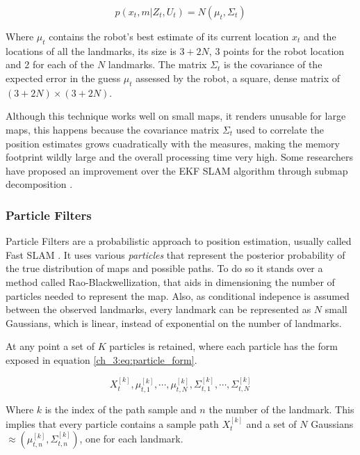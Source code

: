       \begin{equation} \label{ch_3:eq:ekf_representation}
        p(x_{t}, m | Z_{t}, U_{t}) = N(\mu_{t}, \Sigma_{t})
      \end{equation}

      Where $\mu_{t}$ contains the robot's best estimate of its current location $x_{t}$ and the locations of all the landmarks, its size is $3 + 2N$, 3 points for the robot location and 2 for each of the $N$ landmarks. The matrix $\Sigma_{t}$ is the covariance of the expected error in the guess $\mu_{t}$ assessed by the robot, a square, dense matrix of $(3 + 2N) \times (3 + 2N)$.

      Although this technique works well on small maps, it renders unusable for large maps, this happens because the covariance matrix $\Sigma_{t}$ used to correlate the position estimates grows cuadratically with the measures, making the memory footprint wildly large and the overall processing time very high. Some researchers have proposed an improvement over the EKF SLAM algorithm through submap decomposition \cite{Guivant2001, Leonard2000}.

    \subsubsection{Particle Filters}

      Particle Filters are a probabilistic approach to position estimation, usually called Fast SLAM \cite{Montemerlo2002}. It uses various \textit{particles} that represent the posterior probability of the true distribution of maps and possible paths. To do so it stands over a method called Rao-Blackwellization, that aids in dimensioning the number of particles needed to represent the map. Also, as conditional indepence is assumed between the observed landmarks, every landmark can be represented as $N$ small Gaussians, which is linear, instead of exponential on the number of landmarks.

      At any point a set of $K$ particles is retained, where each particle has the form exposed in equation \ref{ch_3:eq:particle_form}.

      \begin{equation} \label{ch_3:eq:particle_form}
        X_{t}^{[k]}, \mu_{t,1}^{[k]}, \cdots, \mu_{t,N}^{[k]}, \Sigma_{t,1}^{[k]}, \cdots, \Sigma_{t,N}^{[k]}
      \end{equation}

      Where $k$ is the index of the path sample and $n$ the number of the landmark. This implies that every particle contains a sample path $X_{t}^{[k]}$ and a set of $N$ Gaussians $\approx (\mu_{t,n}^{[k]}, \Sigma_{t,n}^{[k]})$, one for each landmark.

